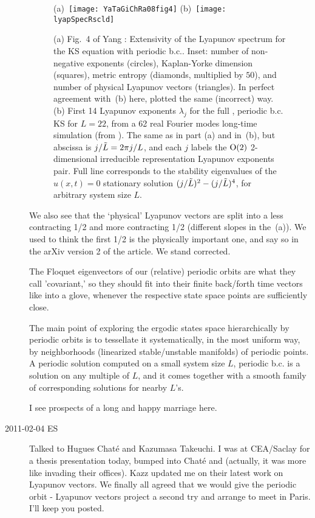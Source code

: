 \begin{description}
\begin{figure}
 (a)~\texttt{[image: YaTaGiChRa08fig4]}
 (b)~\texttt{[image: lyapSpecRscld]}
\caption{
(a)
Fig.~4 of
Yang \etal{}:
Extensivity of the Lyapunov spectrum for the KS equation with
periodic b.c.. Inset: number of non-negative exponents (circles),
Kaplan-Yorke dimension (squares), metric entropy (diamonds,
multiplied by $50$), and number of physical Lyapunov vectors (triangles).
In perfect agreement with
\,(b) here, plotted the same
(incorrect) way.
(b)
First 14 Lyapunov exponents $\lambda_j$ for the full
\statesp, periodic b.c. KS for $L=22$, from a 62 real Fourier
modes long-time simulation (from ).
The same as in part (a) and in \,(b), but
abscissa is $j/\tilde{L} = 2 \pi j/L$, and each $j$ labels
the $\textrm{O}(2)$ 2-dimensional irreducible representation
Lyapunov exponents pair.  Full line corresponds to
the stability eigenvalues
of the $u(x,t)=0$ stationary solution
$(j/\tilde{L})^2- (j/\tilde{L})^4$, for arbitrary system size $L$.
}
\label{fig:lyapSpecRscld}
\end{figure}


We also see
that the `physical' Lyapunov vectors are split into a less contracting 1/2
and more contracting 1/2 (different slopes in the
\,(a)). We
used to think the first 1/2 is the physically important one,
and say so in the arXiv version 2 of the article.
We stand corrected.

The Floquet eigenvectors of our (relative) periodic orbits are
what they call 'covariant,' so they should fit into their finite back/forth
time vectors like into a glove, whenever the respective state space
points are sufficiently close.

The main point of exploring the ergodic states space hierarchically
by periodic orbits is to tessellate it systematically, in the most
uniform way, by neighborhoods (linearized stable/unstable manifolds)
of periodic points. A periodic solution computed on a small system
size $L$, periodic b.c. is a solution on any multiple of $L$, and it comes
together with a smooth family of corresponding solutions for nearby
$L$'s.

I see prospects of a long and happy marriage here.

\item[2011-02-04 ES] Talked to Hugues Chat\'{e} and Kazumasa Takeuchi.
I was at CEA/Saclay for a thesis presentation today, bumped into Chat\'{e}
and
(actually, it was more like invading their offices). Kazz updated me on
their latest work on Lyapunov vectors. We finally all agreed that we would give
the periodic orbit - Lyapunov vectors project a second try and arrange to meet
in Paris. I'll keep you posted.



\end{description}
